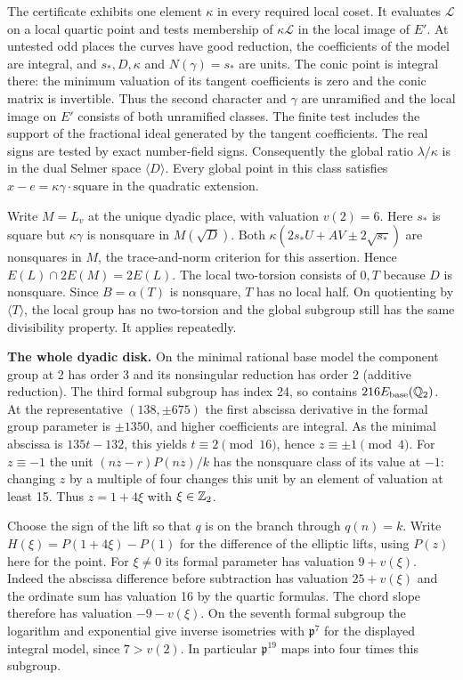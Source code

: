 The certificate exhibits one element \(\kappa\) in every required local
coset. It evaluates \(\mathcal L\) on a local quartic point and tests
membership of \(\kappa\mathcal L\) in the local image of \(E'\).
At untested odd places the curves have good reduction, the coefficients
of the model are integral, and \(s_*,D,\kappa\) and \(N(\gamma)=s_*\) are units.
The conic point is integral there: the minimum valuation of its tangent
coefficients is zero and the conic matrix is invertible. Thus the
second character and \(\gamma\) are unramified and the local image on
\(E'\) consists of both unramified classes. The finite test includes
the support of the fractional ideal generated by the tangent coefficients.
The real signs are tested by exact number-field signs. Consequently the
global ratio \(\lambda/\kappa\) is in the dual Selmer space
\(\langle D\rangle\). Every global point in this class satisfies
\(x-e=\kappa\gamma\cdot\mathrm{square}\) in the quadratic extension.

Write \(M=L_v\) at the unique dyadic place, with valuation \(v(2)=6\).
Here \(s_*\) is square but \(\kappa\gamma\) is nonsquare in
\(M(\sqrt D)\). Both \(\kappa(2s_*U+AV\pm2\sqrt{s_*})\) are
nonsquares in \(M\), the trace-and-norm criterion for this assertion.
Hence \(E(L)\cap2E(M)=2E(L)\). The local two-torsion consists of
\(0,T\) because \(D\) is nonsquare. Since \(B=\alpha(T)\) is
nonsquare, \(T\) has no local half. On quotienting by \(\langle
T\rangle\), the local group has no two-torsion and the global subgroup
still has the same divisibility property. It applies repeatedly.

\textbf{The whole dyadic disk.} On the minimal rational base model the
component group at 2 has order 3 and its nonsingular reduction
has order 2 (additive reduction). The third formal subgroup has index
24, so contains \(216E_{\rm base}(\mathbb Q_2)\).
At the representative \((138,\pm675)\) the first abscissa derivative
in the formal group parameter is \(\pm1350\), and higher coefficients
are integral. As the minimal abscissa is \(135t-132\), this yields
\(t\equiv2\pmod {16}\), hence \(z\equiv\pm1\pmod4\).
For \(z\equiv-1\) the unit \((nz-r)P(nz)/k\) has the nonsquare
class of its value at \(-1\): changing \(z\) by a multiple of four
changes this unit by an element of valuation at least 15. Thus
\(z=1+4\xi\) with \(\xi\in\mathbb Z_2\).

Choose the sign of the lift so that \(q\) is on the branch through
\(q(n)=k\). Write \(H(\xi)=P(1+4\xi)-P(1)\) for the difference of the
elliptic lifts, using \(P(z)\) here for the point. For \(\xi\ne0\)
its formal parameter has valuation \(9+v(\xi)\). Indeed the
abscissa difference before subtraction has valuation \(25+v(\xi)\)
and the ordinate sum has valuation 16 by the quartic formulas. The
chord slope therefore has valuation \(-9-v(\xi)\).
On the seventh formal subgroup the logarithm and exponential give
inverse isometries with \(\mathfrak p^7\) for the displayed integral
model, since \(7>v(2)\). In particular \(\mathfrak p^{19}\) maps into
four times this subgroup.

